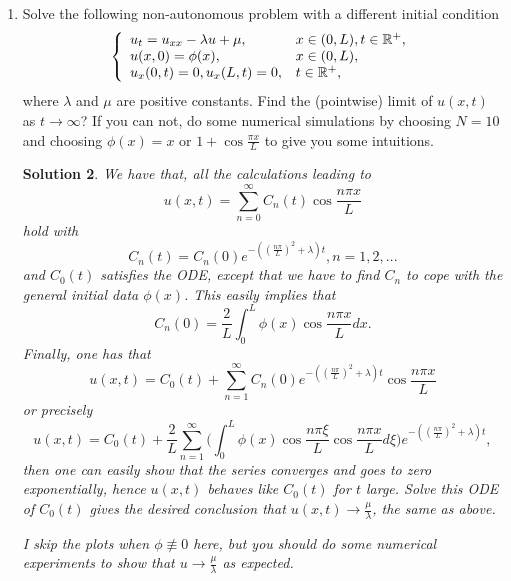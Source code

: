 \documentclass[6pt]{article}
\newtheorem{solution}{Solution}
\numberwithin{equation}{section}
\def\mathbb{\Bbb}
\begin{document}
\begin{enumerate}
\begin{solution}
Indeed, we can formally expect this solution without even solving the PDE.  This IBVP describes a homogeneous well-insulated bar with zero temperature, therefore, there is no heat flux at all afterward, hence the PDE indeed should be an ODE.  Solving the ODE gives the desired solution.
\end{solution}

\item  Solve the following non-autonomous problem with a different initial condition
\begin{equation}\label{5a}
\left\{
\begin{array}{ll}
u_t=u_{xx}-\lambda u+\mu,& x\in(0,L),t\in\mathbb R^+,\\
u(x,0)=\phi(x),&x\in(0,L),\\
u_x(0,t)=0, u_x(L,t)=0, &t\in\mathbb R^+,
\end{array}
\right.
\end{equation}
where $\lambda$ and $\mu$ are positive constants.  Find the (pointwise) limit of $u(x,t)$ as $t\rightarrow\infty$?  If you can not, do some numerical simulations by choosing $N=10$ and choosing $\phi(x)=x$ or $1+\cos \frac{\pi x}{L}$ to give you some intuitions.
\begin{solution}
We have that, all the calculations leading to
\[u(x,t)=\sum_{n=0}^\infty C_n(t)\cos \frac{n\pi x}{L}\]
hold with
\[C_n(t)=C_n(0)e^{-((\frac{n\pi}{L})^2+\lambda)t}, n=1,2,...\]
and $C_0(t)$ satisfies the ODE, except that we have to find $C_n$ to cope with the general initial data $\phi(x)$.  This easily implies that
\[C_n(0)=\frac{2}{L}\int_0^ L \phi(x)\cos \frac{n\pi x}{L}dx. \]
Finally, one has that
\[u(x,t)=C_0(t)+\sum_{n=1}^\infty C_n(0)e^{-((\frac{n\pi}{L})^2+\lambda)t}\cos \frac{n\pi x}{L}\]
or precisely
\[u(x,t)=C_0(t)+\frac{2}{L} \sum_{n=1}^\infty \Big(\int_0^ L \phi(x)\cos \frac{n\pi \xi}{L} \cos \frac{n\pi x}{L} d\xi \Big)e^{-((\frac{n\pi}{L})^2+\lambda)t},\]
then one can easily show that the series converges and goes to zero exponentially, hence $u(x,t)$ behaves like $C_0(t)$ for $t$ large.  Solve this ODE of $C_0(t)$ gives the desired conclusion that $u(x,t)\rightarrow \frac{\mu}{\lambda}$, the same as above.

I skip the plots when $\phi\not\equiv 0$ here, but you should do some numerical experiments to show that $u\rightarrow \frac{\mu}{\lambda}$ as expected.
\end{solution}
\end{enumerate}
\end{document}
